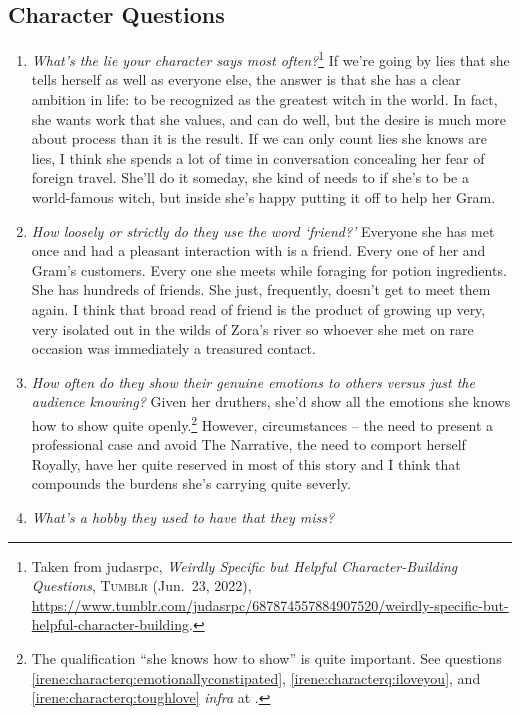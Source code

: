   \subsection{Character Questions}
  \begin{enumerate}
    \item \textit{What’s the lie your character says most often?}\footnote{Taken from judasrpc, \textit{Weirdly Specific but Helpful Character-Building Questions}, \textsc{Tumblr} (Jun.~23, 2022), \url{https://www.tumblr.com/judasrpc/687874557884907520/weirdly-specific-but-helpful-character-building}.}\label{irene:characterqs:lies}
      If we're going by lies that she tells herself as well as everyone else, the answer is that she has a clear ambition in life: to be recognized as the greatest witch in the world. In fact, she wants work that she values, and can do well, but the desire is much more about process than it is the result. If we can only count lies she knows are lies, I think she spends a lot of time in conversation concealing her fear of foreign travel. She'll do it someday, she kind of needs to if she's to be a world-famous witch, but inside she's happy putting it off to help her Gram.  
    \item \textit{How loosely or strictly do they use the word ‘friend?’}
      Everyone she has met once and had a pleasant interaction with is a friend. Every one of her and Gram's customers. Every one she meets while foraging for potion ingredients. She has hundreds of friends. She just, frequently, doesn't get to meet them again. I think that broad read of friend is the product of growing up very, very isolated out in the wilds of Zora's river so whoever she met on rare occasion was immediately a treasured contact. 
    \item \textit{How often do they show their genuine emotions to others versus just the audience knowing?}
      Given her druthers, she'd show all the emotions she knows how to show quite openly.\footnote{The qualification ``she knows how to show'' is quite important. See questions \ref{irene:characterq:emotionallyconstipated}, \ref{irene:characterq:iloveyou}, and \ref{irene:characterq:toughlove} \textit{infra} at \pageref{irene:characterq:emotionallyconstipated}.} However, circumstances -- the need to present a professional case and avoid The Narrative, the need to comport herself Royally, have her quite reserved in most of this story and I think that compounds the burdens she's carrying quite severly.
    \item \textit{What’s a hobby they used to have that they miss?}

\end{enumerate}
